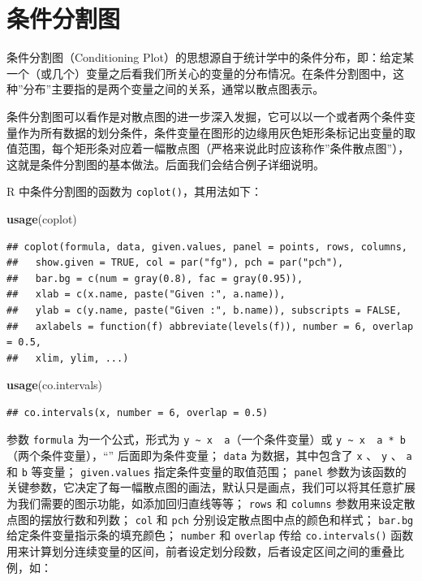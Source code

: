 \documentclass[
  b5paper,
  UTF8,twoside]{book}
\newenvironment{Shaded}{\begin{snugshade}}{\end{snugshade}}
\newcommand{\FunctionTok}[1]{\textcolor[rgb]{0.13,0.29,0.53}{\textbf{#1}}}
\newcommand{\NormalTok}[1]{#1}
\begin{document}
\section{条件分割图}\label{sec:coplot}

条件分割图（Conditioning Plot）的思想源自于统计学中的条件分布，即：给定某一个（或几个）变量之后看我们所关心的变量的分布情况。在条件分割图中，这种''分布''主要指的是两个变量之间的关系，通常以散点图表示。

条件分割图可以看作是对散点图的进一步深入发掘，它可以以一个或者两个条件变量作为所有数据的划分条件，条件变量在图形的边缘用灰色矩形条标记出变量的取值范围，每个矩形条对应着一幅散点图（严格来说此时应该称作''条件散点图''），这就是条件分割图的基本做法。后面我们会结合例子详细说明。

R 中条件分割图的函数为 \texttt{coplot()}，其用法如下：

\begin{Shaded}
\begin{Highlighting}[]
\FunctionTok{usage}\NormalTok{(coplot)}
\end{Highlighting}
\end{Shaded}

\begin{verbatim}
## coplot(formula, data, given.values, panel = points, rows, columns,
##   show.given = TRUE, col = par("fg"), pch = par("pch"),
##   bar.bg = c(num = gray(0.8), fac = gray(0.95)),
##   xlab = c(x.name, paste("Given :", a.name)),
##   ylab = c(y.name, paste("Given :", b.name)), subscripts = FALSE,
##   axlabels = function(f) abbreviate(levels(f)), number = 6, overlap = 0.5,
##   xlim, ylim, ...)
\end{verbatim}

\begin{Shaded}
\begin{Highlighting}[]
\FunctionTok{usage}\NormalTok{(co.intervals)}
\end{Highlighting}
\end{Shaded}

\begin{verbatim}
## co.intervals(x, number = 6, overlap = 0.5)
\end{verbatim}

参数 \texttt{formula} 为一个公式，形式为 \texttt{y\ \textasciitilde{}\ x\ \textbar{}\ a}（一个条件变量）或 \texttt{y\ \textasciitilde{}\ x\ \textbar{}\ a\ *\ b}（两个条件变量），``\texttt{\textbar{}}'' 后面即为条件变量； \texttt{data} 为数据，其中包含了 \texttt{x} 、 \texttt{y} 、 \texttt{a} 和 \texttt{b} 等变量； \texttt{given.values} 指定条件变量的取值范围； \texttt{panel} 参数为该函数的关键参数，它决定了每一幅散点图的画法，默认只是画点，我们可以将其任意扩展为我们需要的图示功能，如添加回归直线等等； \texttt{rows} 和 \texttt{columns} 参数用来设定散点图的摆放行数和列数； \texttt{col} 和 \texttt{pch} 分别设定散点图中点的颜色和样式； \texttt{bar.bg} 给定条件变量指示条的填充颜色； \texttt{number} 和 \texttt{overlap} 传给 \texttt{co.intervals()} 函数用来计算划分连续变量的区间，前者设定划分段数，后者设定区间之间的重叠比例，如：
\end{document}
